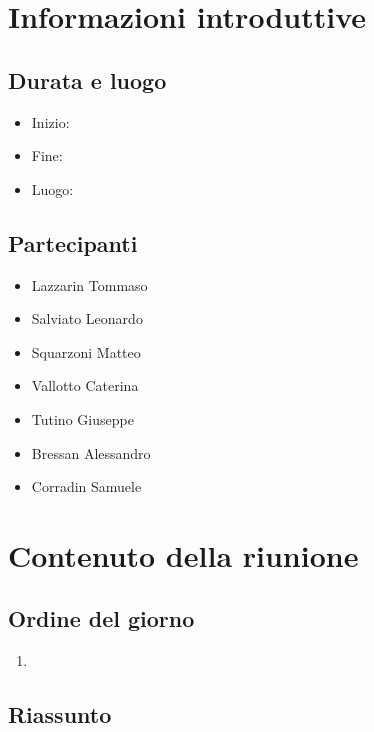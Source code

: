 \documentclass[10pt]{article}
\begin{document}
\tableofcontents{\newpage}

\section{Informazioni introduttive}
\subsection{Durata e luogo}
\begin{itemize}
  \item Inizio:
  \item Fine:
  \item Luogo:
\end{itemize}
\subsection{Partecipanti}
\begin{itemize}
  \item Lazzarin Tommaso
  \item Salviato Leonardo
  \item Squarzoni Matteo
  \item Vallotto Caterina
  \item Tutino Giuseppe
  \item Bressan Alessandro
  \item Corradin Samuele
\end{itemize}

\section{Contenuto della riunione}
\subsection{Ordine del giorno}
\begin{enumerate}
  \item 
\end{enumerate}

\subsection{Riassunto}
\end{document}
